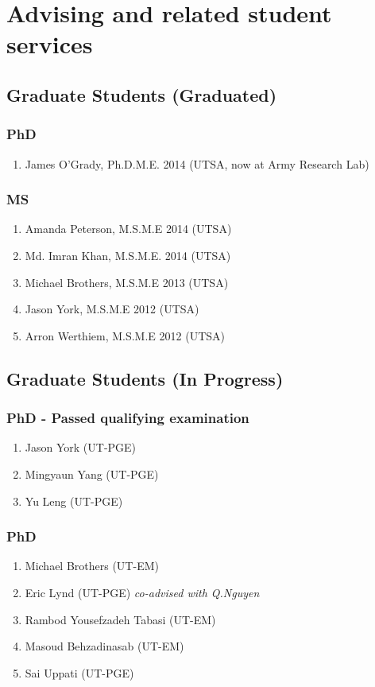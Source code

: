 \section*{Advising and related student services}



\subsection*{Graduate Students (Graduated)}

\subsubsection*{PhD}
\begin{enumerate}
    \item James O'Grady, Ph.D.M.E. 2014 (UTSA, now at Army Research Lab)
\end{enumerate}

\subsubsection*{MS}
\begin{enumerate}
    \item Amanda Peterson, M.S.M.E 2014 (UTSA)
    \item Md. Imran Khan, M.S.M.E. 2014 (UTSA)
    \item Michael Brothers, M.S.M.E 2013 (UTSA)
    \item Jason York, M.S.M.E 2012 (UTSA)
    \item Arron Werthiem, M.S.M.E 2012 (UTSA)
\end{enumerate}

\subsection*{Graduate Students (In Progress)}

\subsubsection*{PhD - Passed qualifying examination}
\begin{enumerate}
    \item Jason York (UT-PGE)
    \item Mingyaun Yang (UT-PGE)
    \item Yu Leng (UT-PGE)
\end{enumerate}

\subsubsection*{PhD}
\begin{enumerate}
    \item Michael Brothers (UT-EM)
    \item Eric Lynd (UT-PGE) \emph{co-advised with Q.Nguyen}
    \item Rambod Yousefzadeh Tabasi (UT-EM)
    \item Masoud Behzadinasab (UT-EM)
    \item Sai Uppati (UT-PGE)
\end{enumerate}

